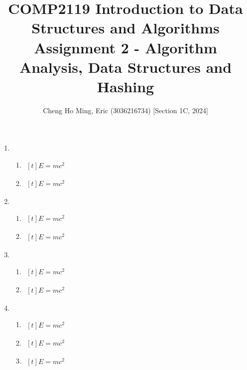 \documentclass{article}
\title{COMP2119 Introduction to Data Structures and Algorithms
Assignment 2 - Algorithm Analysis, Data Structures and Hashing}
\author{Cheng Ho Ming, Eric (3036216734) [Section 1C, 2024]}
\begin{document}
\maketitle

\begin{enumerate}
\item
    \begin{enumerate}[label=(\alph*)]
        \item 
        $\begin{aligned}[t]
        E=mc^2
        \end{aligned}$

        \item 
        $\begin{aligned}[t]
        E=mc^2
        \end{aligned}$
    \end{enumerate}

\item 
    \begin{enumerate}[label=(\alph*)]
        \item 
        $\begin{aligned}[t]
        E=mc^2
        \end{aligned}$

        \item 
        $\begin{aligned}[t]
        E=mc^2
        \end{aligned}$
    \end{enumerate}

\item 
    \begin{enumerate}[label=(\alph*)]
        \item 
        $\begin{aligned}[t]
        E=mc^2
        \end{aligned}$
        
        \item 
        $\begin{aligned}[t]
        E=mc^2
        \end{aligned}$
    \end{enumerate}

\item 
    \begin{enumerate}[label=(\alph*)]
        \item 
        $\begin{aligned}[t]
        E=mc^2
        \end{aligned}$
        
        \item 
        $\begin{aligned}[t]
        E=mc^2
        \end{aligned}$
        
        \item 
        $\begin{aligned}[t]
        E=mc^2
        \end{aligned}$
    \end{enumerate}

\end{enumerate}
\end{document}
